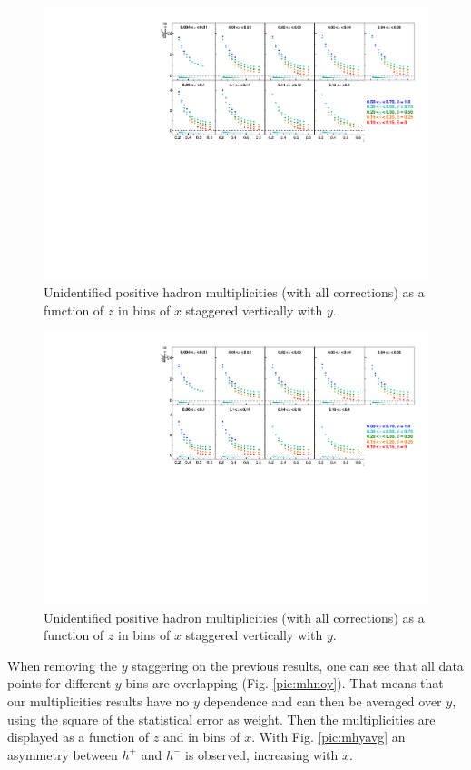 \begin{figure}[!h]
  \centering
	\includegraphics[scale=0.85]{./gfx/hp.pdf}
	\caption{Unidentified positive hadron multiplicities (with all corrections) as a function of $z$ in bins of $x$ staggered vertically with $y$.}
	\label{pic:mhp}
\end{figure}

\begin{figure}[!h]
  \centering
	\includegraphics[scale=0.85]{./gfx/hm.pdf}
	\caption{Unidentified positive hadron multiplicities (with all corrections) as a function of $z$ in bins of $x$ staggered vertically with $y$.}
	\label{pic:mhm}
\end{figure}

When removing the $y$ staggering on the previous results, one can see that all data points for different $y$ bins are overlapping (Fig. \ref{pic:mhnoy}). That means that our multiplicities results have no $y$ dependence and can then be averaged over $y$, using the square of the statistical error as weight. Then the multiplicities are displayed as a function of $z$ and in bins of $x$. With Fig. \ref{pic:mhyavg} an asymmetry between $h^+$ and $h^-$ is observed, increasing with $x$.

